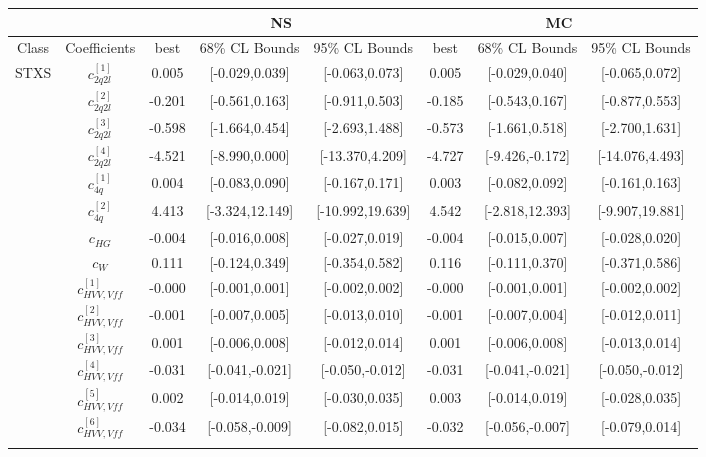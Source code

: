 \documentclass{article}
\begin{document}
\begin{table}[H]
\centering
\begin{tabular}{|c|c|c|c|c|c|c|c|}
\hline
 &  & \multicolumn{3}{c|}{NS}  & \multicolumn{3}{c|}{MC}  \\ \hline
Class & Coefficients & best & 68\% CL Bounds & 95\% CL Bounds & best & 68\% CL Bounds & 95\% CL Bounds\\ \hline
\multirow{28}{*}{STXS}
 & $c_{2q2l}^{[1]}$ & 0.005 & [-0.029,0.039] & [-0.063,0.073]  & 0.005 & [-0.029,0.040] & [-0.065,0.072]  \\ \cline{2-8}
 & $c_{2q2l}^{[2]}$ & -0.201 & [-0.561,0.163] & [-0.911,0.503]  & -0.185 & [-0.543,0.167] & [-0.877,0.553]  \\ \cline{2-8}
 & $c_{2q2l}^{[3]}$ & -0.598 & [-1.664,0.454] & [-2.693,1.488]  & -0.573 & [-1.661,0.518] & [-2.700,1.631]  \\ \cline{2-8}
 & $c_{2q2l}^{[4]}$ & -4.521 & [-8.990,0.000] & [-13.370,4.209]  & -4.727 & [-9.426,-0.172] & [-14.076,4.493]  \\ \cline{2-8}
 & $c_{4q}^{[1]}$ & 0.004 & [-0.083,0.090] & [-0.167,0.171]  & 0.003 & [-0.082,0.092] & [-0.161,0.163]  \\ \cline{2-8}
 & $c_{4q}^{[2]}$ & 4.413 & [-3.324,12.149] & [-10.992,19.639]  & 4.542 & [-2.818,12.393] & [-9.907,19.881]  \\ \cline{2-8}
 & $c_{HG}$ & -0.004 & [-0.016,0.008] & [-0.027,0.019]  & -0.004 & [-0.015,0.007] & [-0.028,0.020]  \\ \cline{2-8}
 & $c_{W}$ & 0.111 & [-0.124,0.349] & [-0.354,0.582]  & 0.116 & [-0.111,0.370] & [-0.371,0.586]  \\ \cline{2-8}
 & $c_{HVV,Vff}^{[1]}$ & -0.000 & [-0.001,0.001] & [-0.002,0.002]  & -0.000 & [-0.001,0.001] & [-0.002,0.002]  \\ \cline{2-8}
 & $c_{HVV,Vff}^{[2]}$ & -0.001 & [-0.007,0.005] & [-0.013,0.010]  & -0.001 & [-0.007,0.004] & [-0.012,0.011]  \\ \cline{2-8}
 & $c_{HVV,Vff}^{[3]}$ & 0.001 & [-0.006,0.008] & [-0.012,0.014]  & 0.001 & [-0.006,0.008] & [-0.013,0.014]  \\ \cline{2-8}
 & $c_{HVV,Vff}^{[4]}$ & -0.031 & [-0.041,-0.021] & [-0.050,-0.012]  & -0.031 & [-0.041,-0.021] & [-0.050,-0.012]  \\ \cline{2-8}
 & $c_{HVV,Vff}^{[5]}$ & 0.002 & [-0.014,0.019] & [-0.030,0.035]  & 0.003 & [-0.014,0.019] & [-0.028,0.035]  \\ \cline{2-8}
 & $c_{HVV,Vff}^{[6]}$ & -0.034 & [-0.058,-0.009] & [-0.082,0.015]  & -0.032 & [-0.056,-0.007] & [-0.079,0.014]  \\ \cline{2-8}

\end{tabular}
\end{table}
\end{document}
